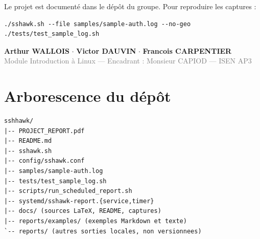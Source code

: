 \documentclass[11pt,a4paper]{article}
\newcommand{\NewSectionPage}{\clearpage}
\begin{document}
Le projet est documenté dans le dépôt du groupe. Pour reproduire les captures :
\begin{lstlisting}
./sshawk.sh --file samples/sample-auth.log --no-geo
./tests/test_sample_log.sh
\end{lstlisting}

\vspace{0.8em}
\begin{center}
  \begin{tcolorbox}[colback=junialight,colframe=juniapurple!35,arc=2mm,width=0.85\textwidth,boxrule=0.6pt,
    borderline west={3pt}{0pt}{juniapurple}]
    \centering
    \small
    \textbf{Arthur WALLOIS} \enspace$\cdot$\enspace
    \textbf{Victor DAUVIN} \enspace$\cdot$\enspace
    \textbf{Francois CARPENTIER}\\[0.2cm]
    \textcolor{gray}{Module Introduction à Linux — Encadrant : Monsieur CAPIOD — ISEN AP3}
  \end{tcolorbox}
\end{center}

\NewSectionPage
\appendix
\section{Arborescence du dépôt}

\begin{verbatim}
sshhawk/
|-- PROJECT_REPORT.pdf
|-- README.md
|-- sshawk.sh
|-- config/sshawk.conf
|-- samples/sample-auth.log
|-- tests/test_sample_log.sh
|-- scripts/run_scheduled_report.sh
|-- systemd/sshawk-report.{service,timer}
|-- docs/ (sources LaTeX, README, captures)
|-- reports/examples/ (exemples Markdown et texte)
`-- reports/ (autres sorties locales, non versionnees)
\end{verbatim}
\end{document}
